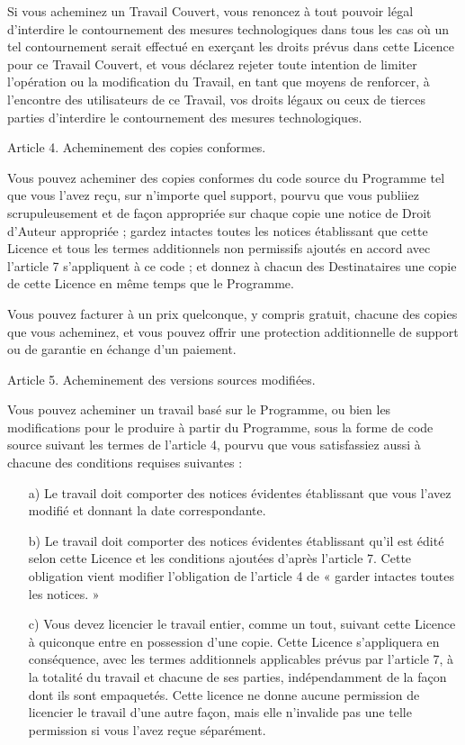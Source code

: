 {Si vous acheminez un Travail Couvert, vous renoncez à tout pouvoir légal
d’interdire le contournement des mesures technologiques dans tous les
cas où un tel contournement serait effectué en exerçant les droits
prévus dans cette Licence pour ce Travail Couvert, et vous déclarez
rejeter toute intention de limiter l’opération ou la modification du
Travail, en tant que moyens de renforcer, à l’encontre des utilisateurs
de ce Travail, vos droits légaux ou ceux de tierces parties d’interdire
le contournement des mesures technologiques.


Article 4. Acheminement des copies conformes.

Vous pouvez acheminer des copies conformes du code source du Programme
tel que vous l’avez reçu, sur n’importe quel support, pourvu que vous
publiiez scrupuleusement et de façon appropriée sur chaque copie une
notice de Droit d’Auteur appropriée ; gardez intactes toutes les
notices établissant que cette Licence et tous les termes additionnels non
permissifs ajoutés en accord avec l’article 7 s’appliquent à ce code ;
et donnez à chacun des Destinataires une copie de cette Licence en même
temps que le Programme.

Vous pouvez facturer à un prix quelconque, y compris gratuit, chacune
des copies que vous acheminez, et vous pouvez offrir une protection
additionnelle de support ou de garantie en échange d’un paiement.


Article 5. Acheminement des versions sources modifiées.

Vous pouvez acheminer un travail basé sur le Programme, ou bien les
modifications pour le produire à partir du Programme, sous la forme de
code source suivant les termes de l’article 4, pourvu que vous
satisfassiez aussi à chacune des conditions requises suivantes :
\begin{enumerate}
\item [a)] Le travail doit comporter des notices évidentes établissant que
     vous l’avez modifié et donnant la date correspondante.

\item [b)] Le travail doit comporter des notices évidentes établissant qu’il
     est édité selon cette Licence et les conditions ajoutées d’après
     l’article 7. Cette obligation vient modifier l’obligation de
     l’article 4 de « garder intactes toutes les notices. »

\item [c)] Vous devez licencier le travail entier, comme un tout, suivant
     cette Licence à quiconque entre en possession d’une copie. Cette
     Licence s’appliquera en conséquence, avec les termes additionnels
     applicables prévus par l’article 7, à la totalité du travail et
     chacune de ses parties, indépendamment de la façon dont ils sont
     empaquetés. Cette licence ne donne aucune permission de licencier
     le travail d’une autre façon, mais elle n’invalide pas une telle
     permission si vous l’avez reçue séparément. 


\end{enumerate}}

